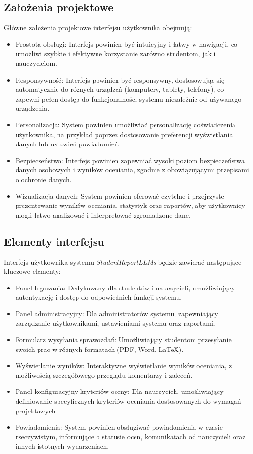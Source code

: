 \documentclass[a4paper, 12pt]{article}
\begin{document}
\subsection{Założenia projektowe}

Główne założenia projektowe interfejsu użytkownika obejmują:

\begin{itemize}
\item Prostota obsługi: Interfejs powinien być intuicyjny i łatwy w nawigacji, co umożliwi szybkie i efektywne korzystanie zarówno studentom, jak i nauczycielom.
\item Responsywność: Interfejs powinien być responsywny, dostosowując się automatycznie do różnych urządzeń (komputery, tablety, telefony), co zapewni pełen dostęp do funkcjonalności systemu niezależnie od używanego urządzenia.
\item Personalizacja: System powinien umożliwiać personalizację doświadczenia użytkownika, na przykład poprzez dostosowanie preferencji wyświetlania danych lub ustawień powiadomień.
\item Bezpieczeństwo: Interfejs powinien zapewniać wysoki poziom bezpieczeństwa danych osobowych i wyników oceniania, zgodnie z obowiązującymi przepisami o ochronie danych.
\item Wizualizacja danych: System powinien oferować czytelne i przejrzyste prezentowanie wyników oceniania, statystyk oraz raportów, aby użytkownicy mogli łatwo analizować i interpretować zgromadzone dane.
\end{itemize}

\subsection{Elementy interfejsu}

Interfejs użytkownika systemu \textit{StudentReportLLMs} będzie zawierać następujące kluczowe elementy:

\begin{itemize}
\item Panel logowania: Dedykowany dla studentów i nauczycieli, umożliwiający autentykację i dostęp do odpowiednich funkcji systemu.
\item Panel administracyjny: Dla administratorów systemu, zapewniający zarządzanie użytkownikami, ustawieniami systemu oraz raportami.
\item Formularz wysyłania sprawozdań: Umożliwiający studentom przesyłanie swoich prac w różnych formatach (PDF, Word, LaTeX).
\item Wyświetlanie wyników: Interaktywne wyświetlanie wyników oceniania, z możliwością szczegółowego przeglądu komentarzy i zaleceń.
\item Panel konfiguracyjny kryteriów oceny: Dla nauczycieli, umożliwiający definiowanie specyficznych kryteriów oceniania dostosowanych do wymagań projektowych.
\item Powiadomienia: System powinien obsługiwać powiadomienia w czasie rzeczywistym, informujące o statusie ocen, komunikatach od nauczycieli oraz innych istotnych wydarzeniach.
\end{itemize}
\end{document}
